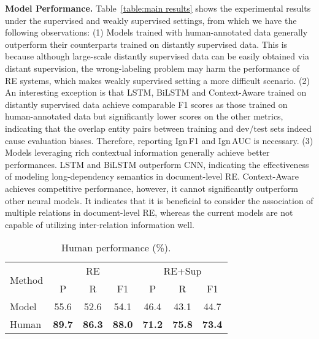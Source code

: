 \documentclass[11pt,a4paper]{article}
\begin{document}
\smallskip
\noindent
\textbf{Model Performance.}
Table~\ref{table:main results} shows the experimental results under the supervised and weakly supervised settings, from which we have the following observations:
(1) Models trained with human-annotated data generally outperform their counterparts trained on distantly supervised data. This is because although large-scale distantly supervised data can be easily obtained via distant supervision, the wrong-labeling problem may harm the performance of RE systems, which makes weakly supervised setting a more difficult scenario. 
(2) An interesting exception is that LSTM, BiLSTM and Context-Aware trained on distantly supervised data achieve comparable F1 scores as those trained on human-annotated data but significantly lower scores on the other metrics, indicating that the overlap entity pairs between training and dev/test sets indeed cause evaluation biases. Therefore, reporting Ign\,F1 and Ign\,AUC is necessary.
(3) Models leveraging rich contextual information generally achieve better performances. LSTM and BiLSTM outperform CNN, indicating the effectiveness of modeling long-dependency semantics in document-level RE. Context-Aware achieves competitive performance, however, it cannot significantly outperform other neural models. It indicates that it is beneficial to consider the association of multiple relations in document-level RE, whereas the current models are not capable of utilizing inter-relation information well.


\begin{table}
\centering
\small

\begin{tabular}{l|c c c| c c c}
\toprule

\multirow{2}{*}{Method} & \multicolumn{3}{c|}{RE}  & \multicolumn{3}{c}{RE+Sup} \\
 & P & R & F1 & P & R & F1\\
 
\midrule

 Model  & 55.6 & 52.6 & 54.1 & 46.4 & 43.1 & 44.7\\ 
 Human  & \textbf{89.7} & \textbf{86.3} & \textbf{88.0} & \textbf{71.2} & \textbf{75.8} & \textbf{73.4} \\

\bottomrule
\end{tabular}
\caption{Human performance (\%).}
\label{table:human performance}
\vspace{-0.5em}
\end{table}
\end{document}
